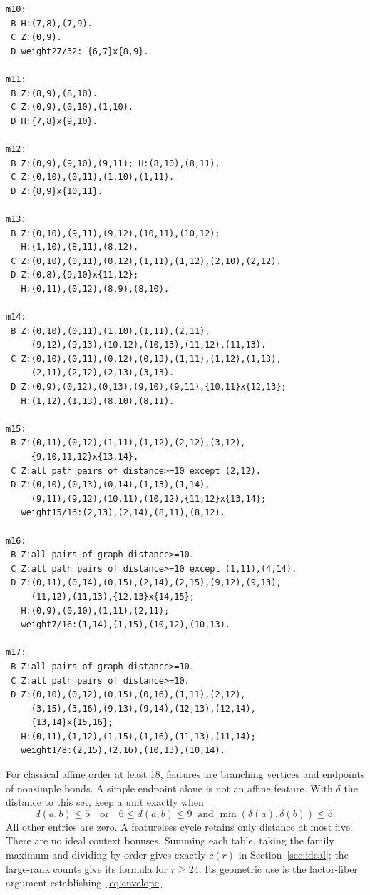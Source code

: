 \documentclass[11pt]{article}
\theoremstyle{remark}\newtheorem{remark}[theorem]{Remark}
\begin{document}
{\small
\begin{verbatim}
m10:
 B H:(7,8),(7,9).
 C Z:(0,9).
 D weight27/32: {6,7}x{8,9}.

m11:
 B Z:(8,9),(8,10).
 C Z:(0,9),(0,10),(1,10).
 D H:{7,8}x{9,10}.

m12:
 B Z:(0,9),(9,10),(9,11); H:(8,10),(8,11).
 C Z:(0,10),(0,11),(1,10),(1,11).
 D Z:{8,9}x{10,11}.

m13:
 B Z:(0,10),(9,11),(9,12),(10,11),(10,12);
   H:(1,10),(8,11),(8,12).
 C Z:(0,10),(0,11),(0,12),(1,11),(1,12),(2,10),(2,12).
 D Z:(0,8),{9,10}x{11,12};
   H:(0,11),(0,12),(8,9),(8,10).

m14:
 B Z:(0,10),(0,11),(1,10),(1,11),(2,11),
     (9,12),(9,13),(10,12),(10,13),(11,12),(11,13).
 C Z:(0,10),(0,11),(0,12),(0,13),(1,11),(1,12),(1,13),
     (2,11),(2,12),(2,13),(3,13).
 D Z:(0,9),(0,12),(0,13),(9,10),(9,11),{10,11}x{12,13};
   H:(1,12),(1,13),(8,10),(8,11).

m15:
 B Z:(0,11),(0,12),(1,11),(1,12),(2,12),(3,12),
     {9,10,11,12}x{13,14}.
 C Z:all path pairs of distance>=10 except (2,12).
 D Z:(0,10),(0,13),(0,14),(1,13),(1,14),
     (9,11),(9,12),(10,11),(10,12),{11,12}x{13,14};
   weight15/16:(2,13),(2,14),(8,11),(8,12).

m16:
 B Z:all pairs of graph distance>=10.
 C Z:all path pairs of distance>=10 except (1,11),(4,14).
 D Z:(0,11),(0,14),(0,15),(2,14),(2,15),(9,12),(9,13),
     (11,12),(11,13),{12,13}x{14,15};
   H:(0,9),(0,10),(1,11),(2,11);
   weight7/16:(1,14),(1,15),(10,12),(10,13).

m17:
 B Z:all pairs of graph distance>=10.
 C Z:all path pairs of distance>=10.
 D Z:(0,10),(0,12),(0,15),(0,16),(1,11),(2,12),
     (3,15),(3,16),(9,13),(9,14),(12,13),(12,14),
     {13,14}x{15,16};
   H:(0,11),(1,12),(1,15),(1,16),(11,13),(11,14);
   weight1/8:(2,15),(2,16),(10,13),(10,14).
\end{verbatim}
}
For classical affine order at least 18, features are branching
vertices and endpoints of nonsimple bonds. A simple endpoint alone
is not an affine feature. With $\delta$ the distance to this set,
keep a unit exactly when
\[
 d(a,b)\le5\quad\text{or}\quad
 6\le d(a,b)\le9\ \text{ and }\min(\delta(a),\delta(b))\le5.
\]
All other entries are zero. A featureless cycle retains only
distance at most five. There are no ideal context bonuses.
Summing each table, taking the family maximum and dividing by
order gives exactly $c(r)$ in Section~\ref{sec:ideal}; the
large-rank counts give its formula for $r\ge24$. Its geometric
use is the factor-fiber argument establishing~\eqref{eq:envelope}.
\end{document}

